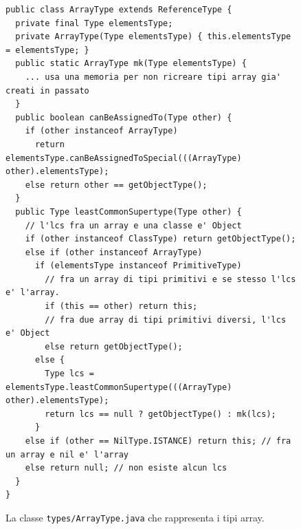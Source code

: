 
\begin{figure}[t]
{\small
\begin{verbatim}
public class ArrayType extends ReferenceType {
  private final Type elementsType;
  private ArrayType(Type elementsType) { this.elementsType = elementsType; }
  public static ArrayType mk(Type elementsType) {
    ... usa una memoria per non ricreare tipi array gia' creati in passato
  }
  public boolean canBeAssignedTo(Type other) {
    if (other instanceof ArrayType)
      return elementsType.canBeAssignedToSpecial(((ArrayType) other).elementsType);
    else return other == getObjectType();
  }
  public Type leastCommonSupertype(Type other) {
    // l'lcs fra un array e una classe e' Object
    if (other instanceof ClassType) return getObjectType();
    else if (other instanceof ArrayType)
      if (elementsType instanceof PrimitiveType)
        // fra un array di tipi primitivi e se stesso l'lcs e' l'array.
        if (this == other) return this;
        // fra due array di tipi primitivi diversi, l'lcs e' Object
        else return getObjectType();
      else {
        Type lcs = elementsType.leastCommonSupertype(((ArrayType) other).elementsType);
        return lcs == null ? getObjectType() : mk(lcs);
      }
    else if (other == NilType.ISTANCE) return this; // fra un array e nil e' l'array
    else return null; // non esiste alcun lcs
  }
}
\end{verbatim}
}
\caption{La classe \texttt{types/ArrayType.java} che rappresenta i tipi array.}\label{fig:types.ArrayType}
\end{figure}


